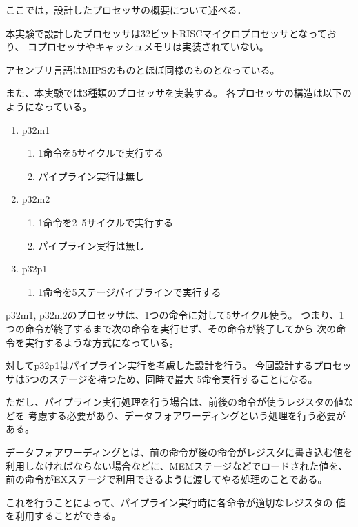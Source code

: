 \documentclass{jarticle}[11pt]
\begin{document}
ここでは，設計したプロセッサの概要について述べる．

本実験で設計したプロセッサは32ビットRISCマイクロプロセッサとなっており、
コプロセッサやキャッシュメモリは実装されていない。

アセンブリ言語はMIPSのものとほぼ同様のものとなっている。

また、本実験では3種類のプロセッサを実装する。
各プロセッサの構造は以下のようになっている。

\begin{enumerate}
\item p32m1
  \begin{enumerate}
    \item 1命令を5サイクルで実行する
    \item パイプライン実行は無し
  \end{enumerate}
\item p32m2
  \begin{enumerate}
    \item 1命令を2~5サイクルで実行する
    \item パイプライン実行は無し
  \end{enumerate}
\item p32p1
  \begin{enumerate}
    \item 1命令を5ステージパイプラインで実行する
  \end{enumerate}
\end{enumerate}

p32m1, p32m2のプロセッサは、1つの命令に対して5サイクル使う。
つまり、1つの命令が終了するまで次の命令を実行せず、その命令が終了してから
次の命令を実行するような方式になっている。

対してp32p1はパイプライン実行を考慮した設計を行う。
今回設計するプロセッサは5つのステージを持つため、同時で最大
5命令実行することになる。

\vspace{0.2in}

ただし、パイプライン実行処理を行う場合は、前後の命令が使うレジスタの値などを
考慮する必要があり、データフォアワーディングという処理を行う必要がある。

データフォアワーディングとは、前の命令が後の命令がレジスタに書き込む値を
利用しなければならない場合などに、MEMステージなどでロードされた値を、
前の命令がEXステージで利用できるように渡してやる処理のことである。

これを行うことによって、パイプライン実行時に各命令が適切なレジスタの
値を利用することができる。
\end{document}
